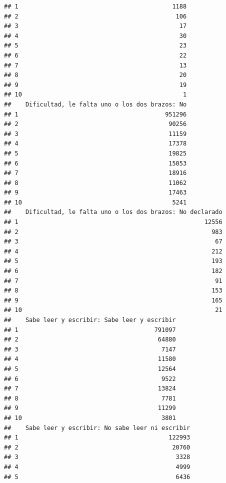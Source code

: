 \documentclass[11pt,]{article}
\begin{document}
\begin{verbatim}
## 1                                           1188
## 2                                            106
## 3                                             17
## 4                                             30
## 5                                             23
## 6                                             22
## 7                                             13
## 8                                             20
## 9                                             19
## 10                                             1
##    Dificultad, le falta uno o los dos brazos: No
## 1                                         951296
## 2                                          90256
## 3                                          11159
## 4                                          17378
## 5                                          19825
## 6                                          15053
## 7                                          18916
## 8                                          11062
## 9                                          17463
## 10                                          5241
##    Dificultad, le falta uno o los dos brazos: No declarado
## 1                                                    12556
## 2                                                      983
## 3                                                       67
## 4                                                      212
## 5                                                      193
## 6                                                      182
## 7                                                       91
## 8                                                      153
## 9                                                      165
## 10                                                      21
##    Sabe leer y escribir: Sabe leer y escribir
## 1                                      791097
## 2                                       64880
## 3                                        7147
## 4                                       11580
## 5                                       12564
## 6                                        9522
## 7                                       13824
## 8                                        7781
## 9                                       11299
## 10                                       3801
##    Sabe leer y escribir: No sabe leer ni escribir
## 1                                          122993
## 2                                           20760
## 3                                            3328
## 4                                            4999
## 5                                            6436

\end{verbatim}
\end{document}
